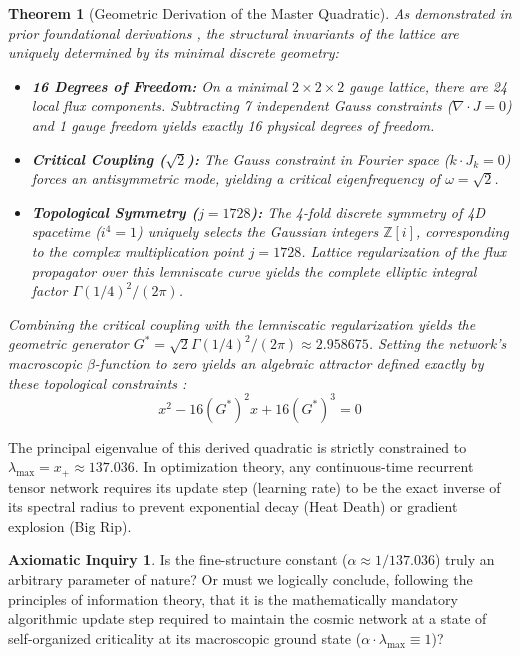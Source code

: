 \documentclass[11pt, letterpaper]{article}
\newcommand{\Z}{\mathbb{Z}}
\newcommand{\G}{G^*}
\newtheorem{theorem}{Theorem}[section]
\theoremstyle{definition}
\newtheorem{inquiry}{Axiomatic Inquiry}[section]
\theoremstyle{remark}
\begin{document}
\begin{theorem}[Geometric Derivation of the Master Quadratic]
As demonstrated in prior foundational derivations \cite{Steinmetz2026_Zenodo}, the structural invariants of the lattice are uniquely determined by its minimal discrete geometry:
\begin{itemize}[noitemsep]
    \item \textbf{16 Degrees of Freedom:} On a minimal $2\times2\times2$ gauge lattice, there are 24 local flux components. Subtracting 7 independent Gauss constraints ($\nabla \cdot J = 0$) and 1 gauge freedom yields exactly 16 physical degrees of freedom.
    \item \textbf{Critical Coupling ($\sqrt{2}$):} The Gauss constraint in Fourier space ($k \cdot J_k = 0$) forces an antisymmetric mode, yielding a critical eigenfrequency of $\omega = \sqrt{2}$.
    \item \textbf{Topological Symmetry ($j=1728$):} The 4-fold discrete symmetry of 4D spacetime ($i^4=1$) uniquely selects the Gaussian integers $\Z[i]$, corresponding to the complex multiplication point $j=1728$. Lattice regularization of the flux propagator over this lemniscate curve yields the complete elliptic integral factor $\Gamma(1/4)^2 / (2\pi)$.
\end{itemize}
Combining the critical coupling with the lemniscatic regularization yields the geometric generator $\G = \sqrt{2}\Gamma(1/4)^2 / (2\pi) \approx 2.958675$. Setting the network's macroscopic $\beta$-function to zero yields an algebraic attractor defined exactly by these topological constraints \cite{Steinmetz2026_Zenodo}:
\begin{equation}
    x^2 - 16(\G)^2 x + 16(\G)^3 = 0
\end{equation}
\end{theorem}

The principal eigenvalue of this derived quadratic is strictly constrained to $\lambda_{\max} = x_+ \approx 137.036$. In optimization theory, any continuous-time recurrent tensor network requires its update step (learning rate) to be the exact inverse of its spectral radius to prevent exponential decay (Heat Death) or gradient explosion (Big Rip).

\begin{inquiry}
Is the fine-structure constant ($\alpha \approx 1/137.036$) truly an arbitrary parameter of nature? Or must we logically conclude, following the principles of information theory, that it is the mathematically mandatory algorithmic update step required to maintain the cosmic network at a state of self-organized criticality \cite{Bak1987} at its macroscopic ground state ($\alpha \cdot \lambda_{\max} \equiv 1$)?
\end{inquiry}
\end{document}
